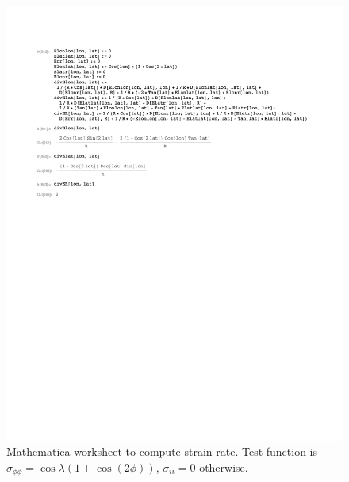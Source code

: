 \documentclass[11pt]{report}
\begin{document}
\begin{figure}[htbp]
 \center
 \includegraphics[scale=0.8, trim = 0 4in 0 0, clip]{f/130520_ELonLat_coscos.pdf}
 \caption{Mathematica worksheet to compute strain rate.  Test function is $\sigma_{\phi\phi}=\cos \lambda (1+\cos(2\phi))$, $\sigma_{ii}=0$ otherwise.}
 \label{fig:mathematica4}
\end{figure}
\end{document}
